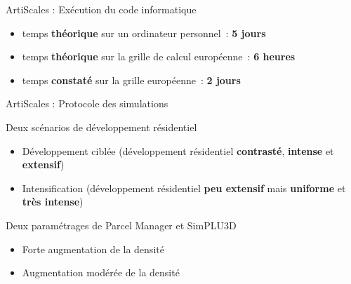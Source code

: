 \documentclass[xcolor=table]{beamer}
\begin{document}
\begin{frame}{ArtiScales : Exécution du code informatique}
\begin{itemize}
	\item temps \textbf{théorique} sur un ordinateur personnel~: \textbf{5 jours}
	\item temps \textbf{théorique} sur la grille de calcul européenne~: \textbf{6 heures}
	\item temps \textbf{constaté} sur la grille européenne~: \textbf{2 jours}
\end{itemize}
\end{frame}

\begin{frame}{ArtiScales : Protocole des simulations}
	\begin{block}{Deux scénarios de développement résidentiel}
		\begin{itemize}
			\small
			\item Développement ciblée (développement résidentiel \textbf{contrasté}, \textbf{intense} et \textbf{extensif})
			\item Intensification (développement résidentiel \textbf{peu extensif} mais \textbf{uniforme} et \textbf{très intense})
		\end{itemize}
	\end{block}
	\begin{block}{Deux paramétrages de Parcel Manager et SimPLU3D}
	\begin{itemize}
		\small
		\item Forte augmentation de la densité
		\item Augmentation modérée de la densité
	\end{itemize}
	\end{block}
\end{frame}
\end{document}
